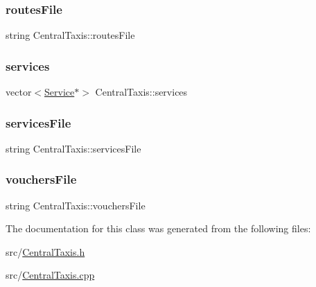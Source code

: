 \hypertarget{classCentralTaxis_af411ccf9a02306f4fb6343607ad9b751}{}\label{classCentralTaxis_af411ccf9a02306f4fb6343607ad9b751} 
\subsubsection{\texorpdfstring{routes\+File}{routesFile}}
{\footnotesize\ttfamily string Central\+Taxis\+::routes\+File\hspace{0.3cm}{\ttfamily [private]}}

\hypertarget{classCentralTaxis_af5c916262a876770f184a31fff7203e5}{}\label{classCentralTaxis_af5c916262a876770f184a31fff7203e5} 
\subsubsection{\texorpdfstring{services}{services}}
{\footnotesize\ttfamily vector$<$\hyperlink{classService}{Service}$\ast$$>$ Central\+Taxis\+::services\hspace{0.3cm}{\ttfamily [private]}}

\hypertarget{classCentralTaxis_a0c57e6ffde520f8145edd96eb0e1fe22}{}\label{classCentralTaxis_a0c57e6ffde520f8145edd96eb0e1fe22} 
\subsubsection{\texorpdfstring{services\+File}{servicesFile}}
{\footnotesize\ttfamily string Central\+Taxis\+::services\+File\hspace{0.3cm}{\ttfamily [private]}}

\hypertarget{classCentralTaxis_a6b4866b7ea58f6672dfab0677cc7a3ed}{}\label{classCentralTaxis_a6b4866b7ea58f6672dfab0677cc7a3ed} 
\subsubsection{\texorpdfstring{vouchers\+File}{vouchersFile}}
{\footnotesize\ttfamily string Central\+Taxis\+::vouchers\+File\hspace{0.3cm}{\ttfamily [private]}}



The documentation for this class was generated from the following files\+:\begin{DoxyCompactItemize}
\item 
src/\hyperlink{CentralTaxis_8h}{Central\+Taxis.\+h}\item 
src/\hyperlink{CentralTaxis_8cpp}{Central\+Taxis.\+cpp}\end{DoxyCompactItemize}
